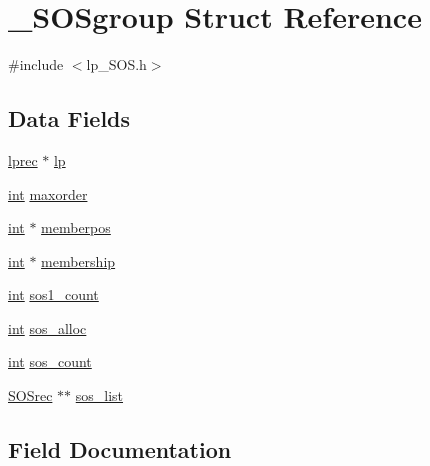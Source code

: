 \hypertarget{struct___s_o_sgroup}{}\section{\+\_\+\+S\+O\+Sgroup Struct Reference}
\label{struct___s_o_sgroup}


{\ttfamily \#include $<$lp\+\_\+\+S\+O\+S.\+h$>$}

\subsection*{Data Fields}
\begin{DoxyCompactItemize}
\item 
\hyperlink{lp__types_8h_afe42f1373b9ee8d824b5cad6a22d24c6}{lprec} $\ast$ \hyperlink{struct___s_o_sgroup_a448cc68e356b190332d47f13935a4438}{lp}
\item 
\hyperlink{lp__lib_8h_adeb9ec6400320e4923ac9d836d509ddb}{int} \hyperlink{struct___s_o_sgroup_a992cf44e4bd18e92a5f727c4762b5b0f}{maxorder}
\item 
\hyperlink{lp__lib_8h_adeb9ec6400320e4923ac9d836d509ddb}{int} $\ast$ \hyperlink{struct___s_o_sgroup_a4aaf945c202b1f64637228912f135de2}{memberpos}
\item 
\hyperlink{lp__lib_8h_adeb9ec6400320e4923ac9d836d509ddb}{int} $\ast$ \hyperlink{struct___s_o_sgroup_aa3bfd8530971e36ec94cf6093f437477}{membership}
\item 
\hyperlink{lp__lib_8h_adeb9ec6400320e4923ac9d836d509ddb}{int} \hyperlink{struct___s_o_sgroup_acd72b0dbee1e3bfaee7df3ef9e7a6035}{sos1\+\_\+count}
\item 
\hyperlink{lp__lib_8h_adeb9ec6400320e4923ac9d836d509ddb}{int} \hyperlink{struct___s_o_sgroup_a615470a1e9fee9f82c0e4d41605df32d}{sos\+\_\+alloc}
\item 
\hyperlink{lp__lib_8h_adeb9ec6400320e4923ac9d836d509ddb}{int} \hyperlink{struct___s_o_sgroup_a71aaf75c7761c386bdf6dbe58a86c62d}{sos\+\_\+count}
\item 
\hyperlink{lp___s_o_s_8h_a57f73546a58296a267805477c139d2af}{S\+O\+Srec} $\ast$$\ast$ \hyperlink{struct___s_o_sgroup_af83cfe819efe1ec662cb71bda7a04d16}{sos\+\_\+list}
\end{DoxyCompactItemize}


\subsection{Field Documentation}
\mbox{\label{struct___s_o_sgroup_a448cc68e356b190332d47f13935a4438}} 
